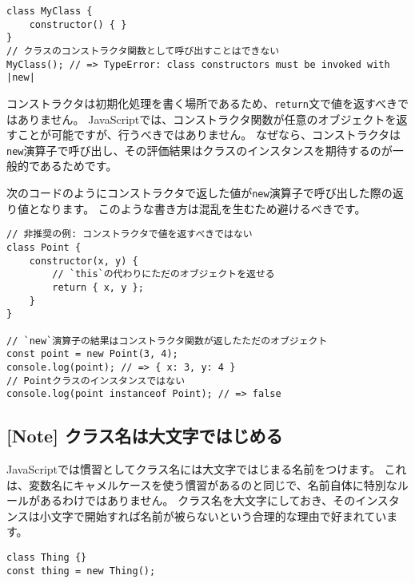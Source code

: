 \begin{lstlisting}
class MyClass {
    constructor() { }
}
// クラスのコンストラクタ関数として呼び出すことはできない
MyClass(); // => TypeError: class constructors must be invoked with |new|
\end{lstlisting}

コンストラクタは初期化処理を書く場所であるため、\texttt{return}文で値を返すべきではありません。
JavaScriptでは、コンストラクタ関数が任意のオブジェクトを返すことが可能ですが、行うべきではありません。
なぜなら、コンストラクタは\texttt{new}演算子で呼び出し、その評価結果はクラスのインスタンスを期待するのが一般的であるためです。

次のコードのようにコンストラクタで返した値が\texttt{new}演算子で呼び出した際の返り値となります。
このような書き方は混乱を生むため避けるべきです。

\begin{lstlisting}
// 非推奨の例: コンストラクタで値を返すべきではない
class Point {
    constructor(x, y) {
        // `this`の代わりにただのオブジェクトを返せる
        return { x, y };
    }
}

// `new`演算子の結果はコンストラクタ関数が返したただのオブジェクト
const point = new Point(3, 4);
console.log(point); // => { x: 3, y: 4 }
// Pointクラスのインスタンスではない
console.log(point instanceof Point); // => false
\end{lstlisting}

\hypertarget{class-name-start-upper-case}{%
\subsection{{[}Note{]}
クラス名は大文字ではじめる}\label{class-name-start-upper-case}}

JavaScriptでは慣習としてクラス名には大文字ではじまる名前をつけます。
これは、変数名にキャメルケースを使う慣習があるのと同じで、名前自体に特別なルールがあるわけではありません。
クラス名を大文字にしておき、そのインスタンスは小文字で開始すれば名前が被らないという合理的な理由で好まれています。

\begin{lstlisting}
class Thing {}
const thing = new Thing();
\end{lstlisting}

